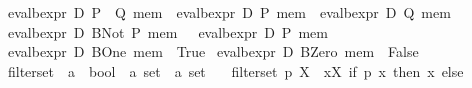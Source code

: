 \begin{isabellebody}
{}\ {}eval{}bexpr\ D\ {}P\ {}{}{}\ Q{}\ mem\ {}\ {}eval{}bexpr\ D\ P\ mem\ {}\ eval{}bexpr\ D\ Q\ mem{}{}\isanewline
{}\ {}eval{}bexpr\ D\ {}BNot\ P{}\ mem\ {}\ {}{}\ eval{}bexpr\ D\ P\ mem{}{}\isanewline
{}\ {}eval{}bexpr\ D\ BOne\ mem\ {}\ True{}\isanewline
{}\ {}eval{}bexpr\ D\ BZero\ mem\ {}\ False{}\isanewline
\isanewline
{}\isamarkupfalse%
\ filter{}set\ {}{}\ {}{}{}a\ {}\ bool{}\ {}\ {}a\ set\ {}\ {}a\ set{}\ \isanewline
\ \ {}filter{}set\ p\ X\ {}\ {}x{}X{}\ if\ p\ x\ then\ {}x{}\ else\ {}{}{}\isanewline

\end{isabellebody}
